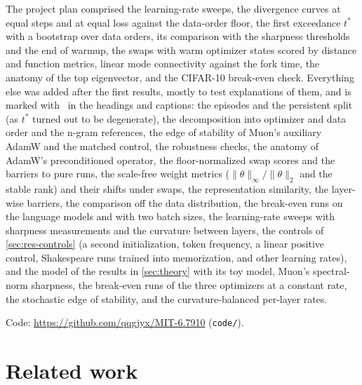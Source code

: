 \documentclass[10pt]{article}
\makeatletter
\renewcommand\paragraph{\@startsection{paragraph}{4}{\z@}{1.2ex \@plus .4ex \@minus .2ex}{-1em}{\normalfont\normalsize\bfseries}}
\makeatother
\begin{document}
\paragraph{Planned and added analyses.} The project plan comprised the learning-rate sweeps, the divergence
curves at equal steps and at equal loss against the data-order floor, the first exceedance $t^\ast$ with a
bootstrap over data orders, its comparison with the sharpness thresholds and the end of warmup, the swaps with
warm optimizer states scored by distance and function metrics, linear mode connectivity against the fork time,
the anatomy of the top eigenvector, and the CIFAR-10 break-even check. Everything else was added after the
first results, mostly to test explanations of them, and is marked with \dag\ in the headings and captions: the episodes and
the persistent split (as $t^\ast$ turned out to be degenerate), the decomposition into optimizer and data order
and the n-gram references, the edge of stability of Muon's auxiliary AdamW and the matched control, the
robustness checks, the anatomy of AdamW's preconditioned operator, the floor-normalized swap scores and the barriers to pure runs, the scale-free weight metrics
($\|\theta\|_\infty/\|\theta\|_2$ and the stable rank) and their shifts under swaps, the representation
similarity, the layer-wise barriers, the comparison off the data distribution, the break-even runs on the
language models and with two batch sizes, the learning-rate sweeps with sharpness measurements and the
curvature between layers, the controls of \cref{sec:res-controls} (a second initialization, token frequency, a
linear positive control, Shakespeare runs trained into memorization, and other learning rates), and the model of
the results in \cref{sec:theory} with its toy model, Muon's spectral-norm sharpness, the break-even runs of the
three optimizers at a constant rate, the stochastic edge of stability, and the curvature-balanced per-layer rates.

Code: \url{https://github.com/qqgjyx/MIT-6.7910} (\texttt{code/}).

\section{Related work}
\label{sec:related}
\end{document}
